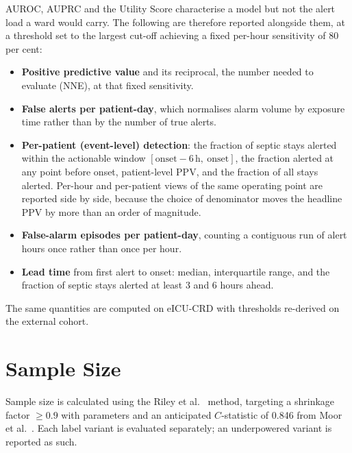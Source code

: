 AUROC, AUPRC and the Utility Score characterise a model but not the alert load
a ward would carry. The following are therefore reported alongside them, at a
threshold set to the largest cut-off achieving a fixed per-hour sensitivity of
80 per cent:

\begin{itemize}
    \item \textbf{Positive predictive value} and its reciprocal, the number
    needed to evaluate (NNE), at that fixed sensitivity.
    \item \textbf{False alerts per patient-day}, which normalises alarm volume
    by exposure time rather than by the number of true alerts.
    \item \textbf{Per-patient (event-level) detection}: the fraction of septic
    stays alerted within the actionable window
    $[\text{onset}-6\,\text{h},\ \text{onset}]$, the fraction alerted at any
    point before onset, patient-level PPV, and the fraction of all stays
    alerted. Per-hour and per-patient views of the same operating point are
    reported side by side, because the choice of denominator moves the headline
    PPV by more than an order of magnitude.
    \item \textbf{False-alarm episodes per patient-day}, counting a contiguous
    run of alert hours once rather than once per hour.
    \item \textbf{Lead time} from first alert to onset: median, interquartile
    range, and the fraction of septic stays alerted at least 3 and 6 hours
    ahead.
\end{itemize}

The same quantities are computed on eICU-CRD with thresholds re-derived on the
external cohort.


\section{Sample Size}
\label{sec:sample_size}

Sample size is calculated using the Riley et al.\ \cite{riley2019sample}
method, targeting a shrinkage factor $\geq 0.9$ with \pcNCandidatePredictors{}
parameters and an anticipated $C$-statistic of 0.846 from Moor et al.\
\cite{moor2023review}. Each label variant is evaluated separately; an
underpowered variant is reported as such.

